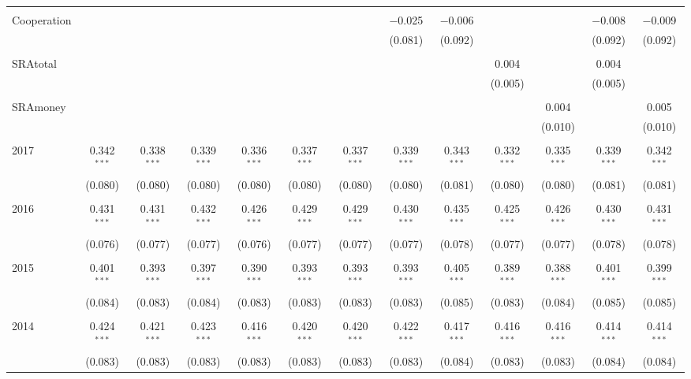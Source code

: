 \begin{subtables}
\begin{table}[H]
\begin{adjustbox}{width=\textwidth}
\begin{tabular}{@{\extracolsep{5pt}}lcccccccccccc}
  & & & & & & & & & & & & \\ 
 Cooperation &  &  &  &  &  &  & $-$0.025 & $-$0.006 &  &  & $-$0.008 & $-$0.009 \\ 
  &  &  &  &  &  &  & (0.081) & (0.092) &  &  & (0.092) & (0.092) \\ 
  & & & & & & & & & & & & \\ 
 SRAtotal &  &  &  &  &  &  &  &  & 0.004 &  & 0.004 &  \\ 
  &  &  &  &  &  &  &  &  & (0.005) &  & (0.005) &  \\ 
  & & & & & & & & & & & & \\ 
 SRAmoney &  &  &  &  &  &  &  &  &  & 0.004 &  & 0.005 \\ 
  &  &  &  &  &  &  &  &  &  & (0.010) &  & (0.010) \\ 
  & & & & & & & & & & & & \\ 
 2017 & 0.342$^{***}$ & 0.338$^{***}$ & 0.339$^{***}$ & 0.336$^{***}$ & 0.337$^{***}$ & 0.337$^{***}$ & 0.339$^{***}$ & 0.343$^{***}$ & 0.332$^{***}$ & 0.335$^{***}$ & 0.339$^{***}$ & 0.342$^{***}$ \\ 
  & (0.080) & (0.080) & (0.080) & (0.080) & (0.080) & (0.080) & (0.080) & (0.081) & (0.080) & (0.080) & (0.081) & (0.081) \\ 
  & & & & & & & & & & & & \\ 
 2016 & 0.431$^{***}$ & 0.431$^{***}$ & 0.432$^{***}$ & 0.426$^{***}$ & 0.429$^{***}$ & 0.429$^{***}$ & 0.430$^{***}$ & 0.435$^{***}$ & 0.425$^{***}$ & 0.426$^{***}$ & 0.430$^{***}$ & 0.431$^{***}$ \\ 
  & (0.076) & (0.077) & (0.077) & (0.076) & (0.077) & (0.077) & (0.077) & (0.078) & (0.077) & (0.077) & (0.078) & (0.078) \\ 
  & & & & & & & & & & & & \\ 
 2015 & 0.401$^{***}$ & 0.393$^{***}$ & 0.397$^{***}$ & 0.390$^{***}$ & 0.393$^{***}$ & 0.393$^{***}$ & 0.393$^{***}$ & 0.405$^{***}$ & 0.389$^{***}$ & 0.388$^{***}$ & 0.401$^{***}$ & 0.399$^{***}$ \\ 
  & (0.084) & (0.083) & (0.084) & (0.083) & (0.083) & (0.083) & (0.083) & (0.085) & (0.083) & (0.084) & (0.085) & (0.085) \\ 
  & & & & & & & & & & & & \\ 
 2014 & 0.424$^{***}$ & 0.421$^{***}$ & 0.423$^{***}$ & 0.416$^{***}$ & 0.420$^{***}$ & 0.420$^{***}$ & 0.422$^{***}$ & 0.417$^{***}$ & 0.416$^{***}$ & 0.416$^{***}$ & 0.414$^{***}$ & 0.414$^{***}$ \\ 
  & (0.083) & (0.083) & (0.083) & (0.083) & (0.083) & (0.083) & (0.083) & (0.084) & (0.083) & (0.083) & (0.084) & (0.084) \\ 

\end{tabular}
\end{adjustbox}
\end{table}
\end{subtables}

